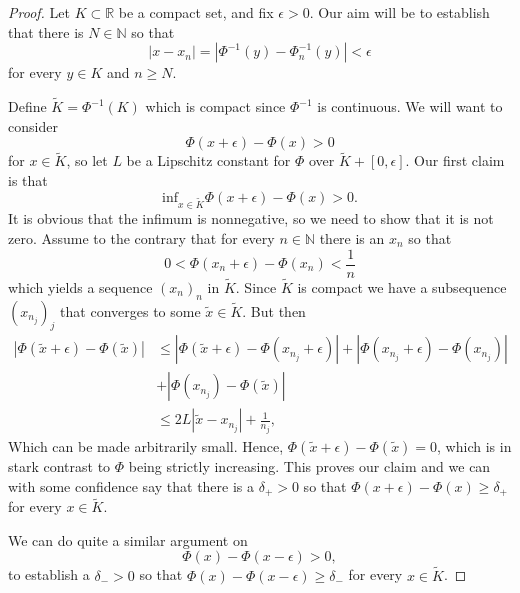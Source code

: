 \documentclass[11pt, a4paper]{article}
\begin{document}
\begin{appendix}
\begin{proof}
Let $K \subset \mathbb{R}$ be a compact set, and fix $\epsilon > 0$. Our aim will be to establish that there is $N \in \mathbb{N}$ so that 
\begin{equation*}
|x-x_n| = |\Phi^{-1}(y) - \Phi_n^{-1}(y)| < \epsilon
\end{equation*}
for every $y \in K$ and $n \geq N$. 

Define $\tilde{K} = \Phi^{-1}(K)$ which is compact since $\Phi^{-1}$ is continuous. We will want to consider
\begin{equation*}
\Phi(x+\epsilon) - \Phi(x) > 0
\end{equation*}
for $x \in \tilde{K}$, so let $L$ be a Lipschitz constant for $\Phi$ over $\tilde{K}+[0,\epsilon]$. Our first claim is that
\begin{equation*}
\mathrm{inf}_{x \in \tilde{K}} \Phi(x+\epsilon) - \Phi(x) > 0.
\end{equation*}
It is obvious that the infimum is nonnegative, so we need to show that it is not zero. Assume to the contrary that for every $n \in \mathbb{N}$ there is an $x_n$ so that
\begin{equation*}
0 < \Phi(x_n + \epsilon) - \Phi(x_n) < \frac{1}{n}
\end{equation*}
which yields a sequence $(x_n)_n$ in $\tilde{K}$. Since $\tilde{K}$ is compact we have a subsequence $(x_{n_j})_j$ that converges to some $ \tilde{x} \in \tilde{K}$. But then
\begin{align*}
|\Phi(\tilde{x} + \epsilon) - \Phi(\tilde{x})| & \leq |\Phi(\tilde{x}+\epsilon) - \Phi(x_{n_j} + \epsilon)| + |\Phi(x_{n_j}+\epsilon) - \Phi(x_{n_j})| \\
&+ |\Phi(x_{n_j}) - \Phi(\tilde{x})| \\
&\leq 2L|\tilde{x}-x_{n_j}| + \frac{1}{n_j},
\end{align*}
Which can be made arbitrarily small. Hence, $\Phi(\tilde{x}+\epsilon) - \Phi(\tilde{x}) = 0$, which is in stark contrast to $\Phi$ being strictly increasing. This proves our claim and we can with some confidence say that there is a $\delta_+>0$ so that $\Phi(x+\epsilon) - \Phi(x) \geq \delta_+$ for every $x \in \tilde{K}$.

We can do quite a similar argument on
\begin{equation*}
\Phi(x) - \Phi(x-\epsilon) > 0,
\end{equation*}
to establish a $\delta_- > 0$ so that $\Phi(x) - \Phi(x-\epsilon) \geq \delta_-$ for every $x\in \tilde{K}$.


\end{proof}
\end{appendix}
\end{document}
